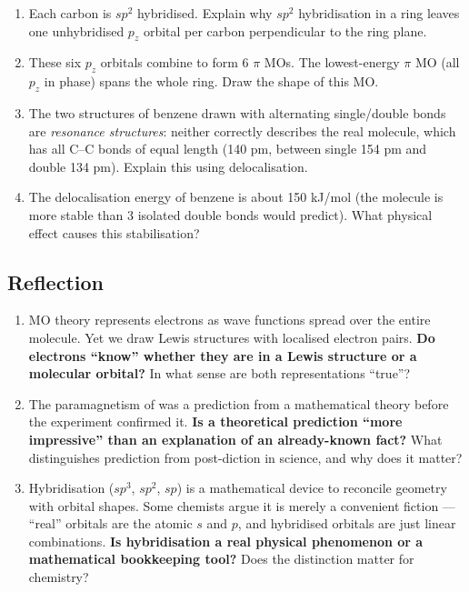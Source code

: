 \documentclass[12pt, a4paper]{book}
\begin{document}
\begin{deepbox}
\begin{enumerate}[label=\textbf{D\arabic*.}]
    \begin{enumerate}[label=(\alph*)]
      \item Each carbon is $sp^2$ hybridised.
            Explain why $sp^2$ hybridisation in a ring
            leaves one unhybridised $p_z$ orbital per carbon
            perpendicular to the ring plane.
      \item These six $p_z$ orbitals combine to form
            6 $\pi$ MOs.
            The lowest-energy $\pi$ MO (all $p_z$ in phase)
            spans the whole ring.
            Draw the shape of this MO.
      \item The two structures of benzene drawn with
            alternating single/double bonds are
            \emph{resonance structures}: neither correctly
            describes the real molecule, which has all
            C--C bonds of equal length (140 pm, between
            single 154 pm and double 134 pm).
            Explain this using delocalisation.
      \item The delocalisation energy of benzene is about
            150 kJ/mol (the molecule is more stable than
            3 isolated double bonds would predict).
            What physical effect causes this stabilisation?
    \end{enumerate}

\end{enumerate}
\end{deepbox}

\subsection*{Reflection}

\begin{reflectionbox}
\begin{enumerate}[label=\textbf{R\arabic*.}]
  \item MO theory represents electrons as wave functions
    spread over the entire molecule.
    Yet we draw Lewis structures with localised electron pairs.
    \textbf{Do electrons ``know'' whether they are in
    a Lewis structure or a molecular orbital?}
    In what sense are both representations ``true''?

  \item The paramagnetism of  was a prediction from
    a mathematical theory before the experiment confirmed it.
    \textbf{Is a theoretical prediction ``more impressive''
    than an explanation of an already-known fact?}
    What distinguishes prediction from post-diction in science,
    and why does it matter?

  \item Hybridisation ($sp^3$, $sp^2$, $sp$) is a mathematical
    device to reconcile geometry with orbital shapes.
    Some chemists argue it is merely a convenient fiction ---
    ``real'' orbitals are the atomic $s$ and $p$,
    and hybridised orbitals are just linear combinations.
    \textbf{Is hybridisation a real physical phenomenon
    or a mathematical bookkeeping tool?}
    Does the distinction matter for chemistry?
\end{enumerate}
\end{reflectionbox}
\end{document}
